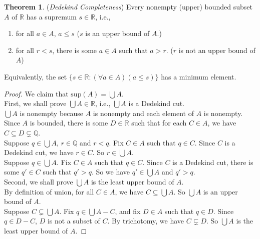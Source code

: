 \documentclass[14pt]{article}
\theoremstyle{definition}
\newtheorem{theorem}[definition]{Theorem}
\newcommand{\bb}[1]{\mathbb{#1}}
\begin{document}
\begin{theorem}
    (\textit{Dedekind Completeness}) Every nonempty (upper) bounded subset $A$ of $\bb{R}$
    has a supremum $s\in\bb{R}$, i.e., 
    \begin{enumerate}
        \item for all $a\in A$, $a\leq s$ ($s$ is an upper bound of $A$.)
        \item for all $r<s$, there is some $a\in A$ such that $a>r$. ($r$ is 
        not an upper bound of $A$)
    \end{enumerate}
    Equivalently, the set $\{s\in\bb{R}\colon (\forall a\in A)(a\leq s)\}$ 
    has a minimum element.
\end{theorem}
\begin{proof}
    We claim that $\mathrm{sup}(A)=\bigcup A$. \\
    First, we shall prove $\bigcup A\in\bb{R}$, i.e., $\bigcup A$ is a Dedekind cut.\\
    $\bigcup A$ is nonempty because $A$ is nonempty and each element of $A$ is nonempty.\\
    Since $A$ is bounded, there is some $D\in\bb{R}$ such that for each $C\in A$, 
    we have $C\subseteq D\subsetneq \bb{Q}$. \\
    Suppose $q\in\bigcup A$, $r\in\bb{Q}$ and $r<q$. Fix $C\in A$ such that $q\in C$. Since 
    $C$ is a Dedekind cut, we have $r\in C$. So $r\in\bigcup A$.\\
    Suppose $q\in\bigcup A$. Fix $C\in A$ such that $q\in C$. Since 
    $C$ is a Dedekind cut, there is some $q'\in C$ such that $q'>q$. So we have $q'\in \bigcup A$
     and $q'>q$.\\
    Second, we shall prove $\bigcup A$ is the least upper bound of $A$.\\
    By definition of union, for all $C\in A$, we have $C\subseteq \bigcup A$. So $\bigcup A$ is
    an upper bound of $A$.\\
    Suppose $C\subsetneq \bigcup A$. Fix $q\in \bigcup A-C$, and fix $D\in A$ such that 
    $q\in D$. Since $q\in D-C$, $D$ is not a subset of $C$. By trichotomy, we have $C\subsetneq D$.
    So $\bigcup A$ is the least upper bound of $A$.



\end{proof}
\end{document}
